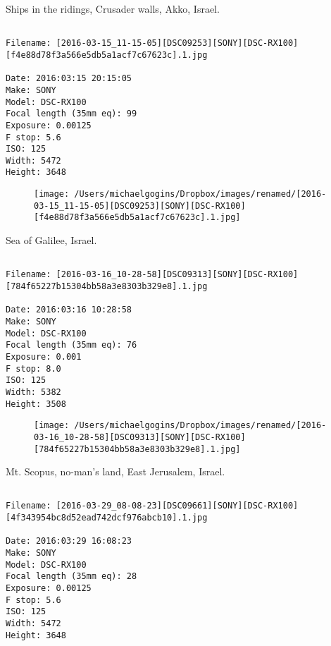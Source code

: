 \documentclass[11pt,letter,DIV=14,paper=landscape]{scrbook}
\begin{document}
\clearpage
\noindent Ships in the ridings, Crusader walls, Akko, Israel.
\noindent
\begin{lstlisting}

Filename: [2016-03-15_11-15-05][DSC09253][SONY][DSC-RX100][f4e88d78f3a566e5db5a1acf7c67623c].1.jpg

Date: 2016:03:15 20:15:05
Make: SONY
Model: DSC-RX100
Focal length (35mm eq): 99
Exposure: 0.00125
F stop: 5.6
ISO: 125
Width: 5472
Height: 3648
\end{lstlisting}
\clearpage

\begin{figure}
\texttt{[image: /Users/michaelgogins/Dropbox/images/renamed/[2016-03-15\_11-15-05][DSC09253][SONY][DSC-RX100][f4e88d78f3a566e5db5a1acf7c67623c].1.jpg]}
\end{figure}
    
\clearpage
\noindent Sea of Galilee, Israel.
\noindent
\begin{lstlisting}

Filename: [2016-03-16_10-28-58][DSC09313][SONY][DSC-RX100][784f65227b15304bb58a3e8303b329e8].1.jpg

Date: 2016:03:16 10:28:58
Make: SONY
Model: DSC-RX100
Focal length (35mm eq): 76
Exposure: 0.001
F stop: 8.0
ISO: 125
Width: 5382
Height: 3508
\end{lstlisting}
\clearpage

\begin{figure}
\texttt{[image: /Users/michaelgogins/Dropbox/images/renamed/[2016-03-16\_10-28-58][DSC09313][SONY][DSC-RX100][784f65227b15304bb58a3e8303b329e8].1.jpg]}
\end{figure}
    
\clearpage
\noindent Mt. Scopus, no-man's land, East Jerusalem, Israel.
\noindent
\begin{lstlisting}

Filename: [2016-03-29_08-08-23][DSC09661][SONY][DSC-RX100][4f343954bc8d52ead742dcf976abcb10].1.jpg

Date: 2016:03:29 16:08:23
Make: SONY
Model: DSC-RX100
Focal length (35mm eq): 28
Exposure: 0.00125
F stop: 5.6
ISO: 125
Width: 5472
Height: 3648
\end{lstlisting}
\clearpage
\end{document}
